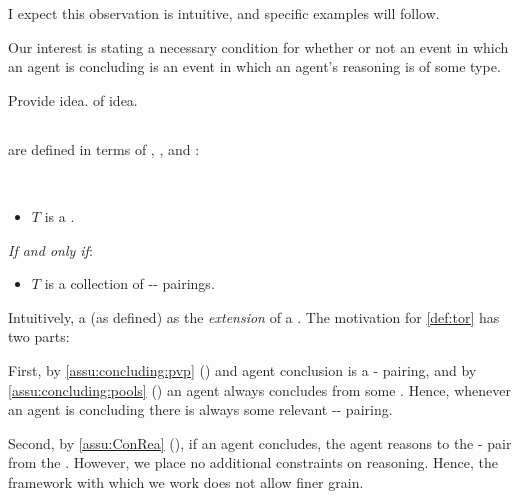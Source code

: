 \begin{note}
  I expect this observation is intuitive, and specific examples will follow.
\end{note}


\begin{note}
  Our interest is stating a necessary condition for whether or not an event in which an agent is concluding is an event in which an agent's reasoning is of some type.

  Provide idea.
   of idea.
\end{note}


\subsection{}
\label{cha:typical:tCDef:ToRdef}

\begin{note}
   are defined in terms of , , and :

  \begin{definition}[A \torN{0}]
    \label{def:tor}
    \mbox{ }
    \vspace{-\baselineskip}
    \begin{itemize}
    \item
      \(T\) is a \torN{}.
    \end{itemize}

    \emph{If and only if}:

    \begin{itemize}
    \item
      \(T\) is a collection of -- pairings.
    \end{itemize}
    \vspace{-\baselineskip}
  \end{definition}

  \noindent%
  Intuitively, a \torN{} (as defined) as the \emph{extension} of a \torN{}.
  The motivation for \autoref{def:tor} has two parts:

  First, by \autoref{assu:concluding:pvp} () and agent conclusion is a - pairing, and by \autoref{assu:concluding:pools} () an agent always concludes from some \pool{}.
  Hence, whenever an agent is concluding there is always some relevant -- pairing.

  Second, by \autoref{assu:ConRea} (), if an agent concludes, the agent reasons to the - pair from the .
  However, we place no additional constraints on reasoning.
  Hence, the framework with which we work does not allow finer grain.
\end{note}

